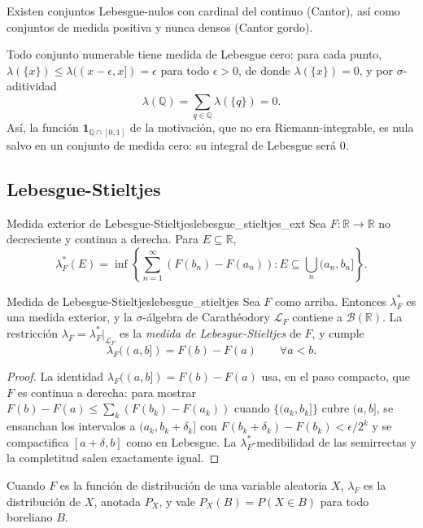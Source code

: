 \documentclass[11pt, a4paper]{article}
\begin{document}
\obs Existen conjuntos Lebesgue-nulos con cardinal del continuo (Cantor), así como conjuntos
de medida positiva y nunca densos (Cantor gordo).

\obs Todo conjunto numerable tiene medida de Lebesgue cero: para cada punto,
$\lambda(\{x\}) \le \lambda((x - \epsilon, x]) = \epsilon$ para todo $\epsilon > 0$, de donde
$\lambda(\{x\}) = 0$, y por $\sigma$-aditividad
$$ \lambda(\mathbb{Q}) = \sum_{q \in \mathbb{Q}} \lambda(\{q\}) = 0. $$
Así, la función $\mathbf{1}_{\mathbb{Q} \cap [0,1]}$ de la motivación, que no era
Riemann-integrable, es nula salvo en un conjunto de medida cero: su integral de Lebesgue
será $0$.

\subsection{Lebesgue-Stieltjes}

\begin{definicion}{Medida exterior de Lebesgue-Stieltjes}{lebesgue_stieltjes_ext}
Sea $F: \mathbb{R} \to \mathbb{R}$ no decreciente y continua a derecha. Para $E \subseteq
\mathbb{R}$,
$$ \lambda_F^*(E) = \inf\!\left\{ \sum_{n=1}^\infty (F(b_n) - F(a_n)) : E \subseteq \bigcup_n
(a_n, b_n] \right\}. $$
\end{definicion}

\begin{teorema}{Medida de Lebesgue-Stieltjes}{lebesgue_stieltjes}
Sea $F$ como arriba. Entonces $\lambda_F^*$ es una medida exterior, y la $\sigma$-álgebra de
Carathéodory $\mathcal{L}_F$ contiene a $\mathcal{B}(\mathbb{R})$. La restricción $\lambda_F =
\lambda_F^*|_{\mathcal{L}_F}$ es la \emph{medida de Lebesgue-Stieltjes} de $F$, y cumple
$$ \lambda_F((a, b]) = F(b) - F(a) \qquad \forall a < b. $$
\end{teorema}

\begin{proof}
La identidad $\lambda_F((a, b]) = F(b) - F(a)$ usa, en el paso compacto, que
$F$ es continua a derecha: para mostrar
$F(b) - F(a) \le \sum_k (F(b_k) - F(a_k))$ cuando $\{(a_k, b_k]\}$ cubre $(a, b]$, se ensanchan los
intervalos a $(a_k, b_k + \delta_k]$ con $F(b_k + \delta_k) - F(b_k) < \epsilon/2^k$
 y se compactifica $[a + \delta, b]$ como en Lebesgue.
La $\lambda_F^*$-medibilidad de las semirrectas y la completitud salen exactamente igual.
\end{proof}

\obs Cuando $F$ es la
función de distribución de una variable aleatoria $X$, $\lambda_F$ es la
distribución de $X$, anotada $P_X$, y vale $P_X(B) = P(X \in B)$ para todo boreliano $B$.
\end{document}
